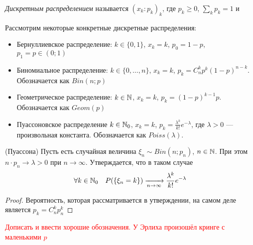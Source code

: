 \begin{definition}
	\textit{Дискретным распределением} называется $(x_k \colon p_k)_k$, где $p_k \ge 0$, $\sum_k p_k = 1$ и 
\end{definition}

Рассмотрим некоторые конкретные дискретные распределения:
\begin{itemize}
	\item Бернуллиевское распределение: $k \in \{0, 1\}$, $x_k = k$, $p_0 = 1 - p$, $p_1 = p \in (0; 1)$
	
	\item Биномиальное распределение: $k \in \{0, \ldots, n\}$, $x_k = k$, $p_k = C_n^k p^k (1 - p)^{n - k}$. Обозначается как $Bin(n; p)$
	
	\item Геометрическое распределение: $k \in \mathbb{N}$, $x_k = k$, $p_k = (1 - p)^{k - 1}p$. Обозначается как $Geom(p)$
	
	\item Пуассоновское распределение $k \in \mathbb{N}_0$, $x_k = k$, $p_k = \frac{\lambda^k}{k!}e^{-\lambda}$, где $\lambda > 0$ --- произвольная константа. Обозначается как $Poiss(\lambda)$.
\end{itemize}

\begin{theorem} (Пуассона)
	Пусть есть случайная величина $\xi_n \sim Bin(n; p_n)$, $n \in \mathbb{N}$. При этом $n \cdot p_n \to \lambda > 0$ при $n \to \infty$. Утверждается, что в таком случае
	\[
		\forall k \in \mathbb{N}_0 \quad P(\{\xi_n = k\}) \xrightarrow[n \to \infty]{} \frac{\lambda^k}{k!}e^{-\lambda}
	\]
\end{theorem}

\begin{proof}
	Вероятность, которая рассматривается в утверждении, на самом деле является $p_k = C_n^k p_n^k$
\end{proof}

\textcolor{red}{Дописать и ввести хорошие обозначения. У Эрлиха произошёл кринге с маленькими $p$}